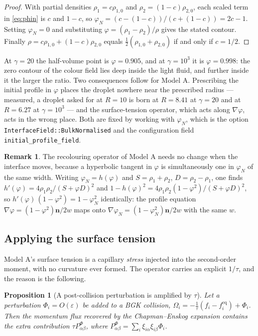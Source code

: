 \documentclass[11pt,a4paper]{article}
\theoremstyle{plain}
\newtheorem{proposition}{Proposition}
\theoremstyle{definition}
\newtheorem{remark}{Remark}
\newcommand{\nn}{\mathbf{n}}
\begin{document}
\begin{proof}
With partial densities $\rho_1 = c\rho_{1,0}$ and $\rho_2 = (1-c)\rho_{2,0}$,
each scaled term in \eqref{eq:phin} is $c$ and $1-c$, so
$\varphi_N = (c - (1-c))/(c + (1-c)) = 2c - 1$. Setting $\varphi_N = 0$ and
substituting $\varphi = (\rho_1 - \rho_2)/\rho$ gives the stated contour.
Finally $\rho = c\rho_{1,0} + (1-c)\rho_{2,0}$ equals
$\tfrac12(\rho_{1,0}+\rho_{2,0})$ if and only if $c = 1/2$. \qedhere
\end{proof}

At $\gamma = 20$ the half-volume point is $\varphi = 0.905$, and at
$\gamma = 10^3$ it is $\varphi = 0.998$: the zero contour of the colour field
lies deep inside the light fluid, and further inside it the larger the ratio.
Two consequences follow for Model A. Prescribing the initial profile in
$\varphi$ places the droplet nowhere near the prescribed radius --- measured, a
droplet asked for at $R = 10$ is born at $R = 8.41$ at $\gamma = 20$ and at
$R = 6.27$ at $\gamma = 10^3$ --- and the surface-tension operator, which acts
along $\nabla\varphi$, acts in the wrong place. Both are fixed by working with
$\varphi_N$, which is the option \texttt{InterfaceField::BulkNormalised} and the
configuration field \texttt{initial\_profile\_field}.

\begin{remark}
The recolouring operator of Model A needs no change when the interface moves,
because a hyperbolic tangent in $\varphi$ is simultaneously one in $\varphi_N$
of the same width. Writing $\varphi_N = h(\varphi)$ and
$S = \rho_1 + \rho_2$, $D = \rho_2 - \rho_1$, one finds
$h'(\varphi) = 4\rho_1\rho_2/(S + \varphi D)^2$ and
$1 - h(\varphi)^2 = 4\rho_1\rho_2(1-\varphi^2)/(S+\varphi D)^2$, so
$h'(\varphi)\,(1 - \varphi^2) = 1 - \varphi_N^2$ identically: the profile
equation $\nabla\varphi = (1-\varphi^2)\nn/2w$ maps onto
$\nabla\varphi_N = (1-\varphi_N^2)\nn/2w$ with the same $w$.
\end{remark}

\subsection{Applying the surface tension}

Model A's surface tension is a capillary \emph{stress} injected into the
second-order moment, with no curvature ever formed. The operator carries an
explicit $1/\tau$, and the reason is the following.

\begin{proposition}[A post-collision perturbation is amplified by $\tau$]
\label{prop:tau}
Let a perturbation $\Phi_i = O(\varepsilon)$ be added to a BGK collision,
$\Omega_i = -\tfrac{1}{\tau}(f_i - f_i^{\mathrm{eq}}) + \Phi_i$. Then the
momentum flux recovered by the Chapman--Enskog expansion contains the extra
contribution $\tau P^\Phi_{\alpha\beta}$, where
$P^\Phi_{\alpha\beta} = \sum_i \xi_{i\alpha}\xi_{i\beta}\Phi_i$.
\end{proposition}
\end{document}
